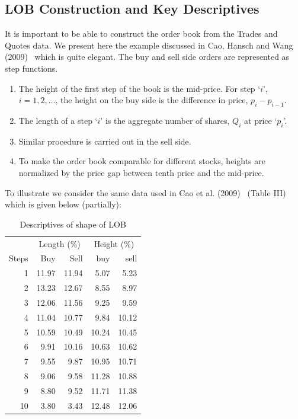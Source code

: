 \subsection{LOB Construction and Key Descriptives}

It is important to be able to construct the order book from the Trades and Quotes data. We present here the example discussed in Cao, Hansch and Wang (2009)~\cite{caohanschwang} which is quite elegant. The buy and sell side orders are represented as step functions. 
        \begin{enumerate}[--]
        \item The height of the first step of the book is the mid-price. For step `$i$', $i=1,2,\ldots$, the height on the buy side is the difference in price, $p_i-p_{i-1}$. 
        \item The length of a step `$i$' is the aggregate number of shares, $Q_i$ at price `$p_i$'.
        \item Similar procedure is carried out in the sell side.
        \item To make the order book comparable for different stocks, heights are normalized by the price gap between tenth price and the mid-price. 
        \end{enumerate}

To illustrate we consider the same data used in Cao et al. (2009)~\cite{caohanschwang} (Table III) which is given below (partially):
	\begin{table}[!ht]
	\centering
	\caption{Descriptives of shape of LOB \label{tab:descLOB}}
	\begin{tabular}{rrrrr}
	& \multicolumn{2}{c}{Length (\%)} & \multicolumn{2}{c}{Height (\%)} \\
	Steps & Buy & Sell & buy & sell \\
	1 & 11.97 & 11.94 & 5.07 & 5.23 \\
	2 & 13.23 & 12.67 & 8.55 & 8.97 \\
	3 & 12.06 & 11.56 & 9.25 & 9.59 \\
	4 & 11.04 & 10.77 & 9.84 & 10.12 \\
	5 & 10.59 & 10.49 & 10.24 & 10.45 \\
	6 & 9.91 & 10.16 & 10.63 & 10.62 \\
	7 & 9.55 & 9.87 & 10.95 & 10.71 \\
	8 & 9.06 & 9.58 & 11.28 & 10.88 \\
	9 & 8.80 & 9.52 & 11.71 & 11.38 \\
	10 & 3.80 & 3.43 & 12.48 & 12.06
	\end{tabular}
	\end{table}

